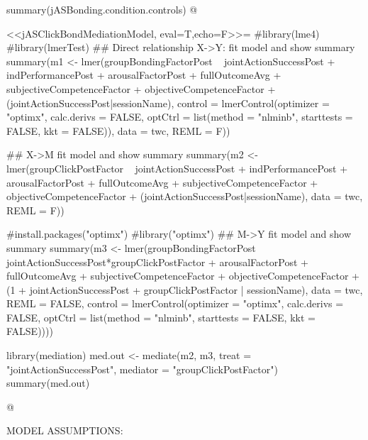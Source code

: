 summary(jASBonding.condition.controls)
@





<<jASClickBondMediationModel, eval=T,echo=F>>=
#library(lme4)
#library(lmerTest)
## Direct relationship X->Y: fit model and show summary
summary(m1 <- lmer(groupBondingFactorPost ~ jointActionSuccessPost +
                            indPerformancePost + arousalFactorPost + fullOutcomeAvg +
                            subjectiveCompetenceFactor + objectiveCompetenceFactor +
                            (jointActionSuccessPost|sessionName),
                            control = lmerControl(optimizer = "optimx", calc.derivs = FALSE, optCtrl = list(method = "nlminb", starttests = FALSE, kkt = FALSE)),
                            data = twc,
                            REML = F))

## X->M fit model and show summary
summary(m2 <- lmer(groupClickPostFactor ~ jointActionSuccessPost +
                                          indPerformancePost + arousalFactorPost + fullOutcomeAvg +
                                          subjectiveCompetenceFactor + objectiveCompetenceFactor +
                                          (jointActionSuccessPost|sessionName),
                                          data = twc,
                                          REML = F))

#install.packages("optimx")
#library("optimx")
## M->Y fit model and show summary
summary(m3 <- lmer(groupBondingFactorPost ~ jointActionSuccessPost*groupClickPostFactor +
                                            arousalFactorPost + fullOutcomeAvg +
                                            subjectiveCompetenceFactor + objectiveCompetenceFactor + (1 + jointActionSuccessPost + groupClickPostFactor | sessionName),
                                            data = twc, REML = FALSE, control = lmerControl(optimizer = "optimx", calc.derivs = FALSE, optCtrl = list(method = "nlminb", starttests = FALSE, kkt = FALSE))))

library(mediation)
med.out <- mediate(m2, m3, treat = "jointActionSuccessPost", mediator = "groupClickPostFactor")
summary(med.out)


@







MODEL ASSUMPTIONS:

